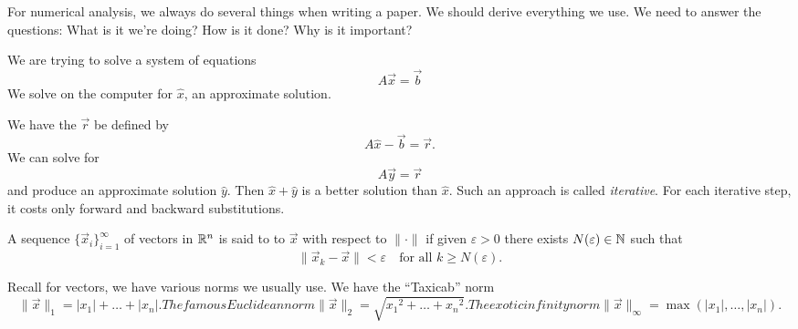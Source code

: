 For numerical analysis, we always do several things when writing a
paper. We should derive everything we use. We need to answer the
questions: What is it we're doing? How is it done? Why is it important?

We are trying to solve a system of equations
\begin{equation}
A\vec{x}=\vec{b}
\end{equation}
We solve on the computer for $\widehat{x}$, an approximate solution.

We have the  $\vec{r}$ be defined by
\begin{equation}
A\widehat{x}-\vec{b}=\vec{r}.
\end{equation}
We can solve for
\begin{equation}
A\vec{y}=\vec{r}
\end{equation}
and produce an approximate solution $\widehat{y}$. Then
$\widehat{x}+\widehat{y}$ is a better solution than $\widehat{x}$. Such
an approach is called \emph{iterative}. For each iterative step, it
costs only forward and backward substitutions.

\begin{defn}
A sequence $\{\vec{x}_{i}\}^{\infty}_{i=1}$ of vectors in $\mathbb{R}^n$ is
said to  to $\vec{x}$ with respect to $\|\cdot\|$ if
given $\varepsilon>0$ there exists $N(\varepsilon)\in\mathbb{N}$ such that
\begin{equation}
\|\vec{x}_{k}-\vec{x}\|<\varepsilon\quad\mbox{for all }k\geq N(\varepsilon).
\end{equation}
\end{defn}

\M Recall for vectors, we have various norms we usually use. We have the
``Taxicab'' norm
\begin{subequations}
\begin{equation}
\|\vec{x}\|_{1} = |x_{1}|+\dots+|x_{n}|.
\end{equation}
The famous Euclidean norm
\begin{equation}
\|\vec{x}\|_{2} = \sqrt{{x_{1}}^{2}+\dots+{x_{n}}^{2}}.
\end{equation}
The exotic infinity norm
\begin{equation}
\|\vec{x}\|_{\infty} = \max(|x_{1}|,\dots,|x_{n}|).
\end{equation}
\end{subequations}

